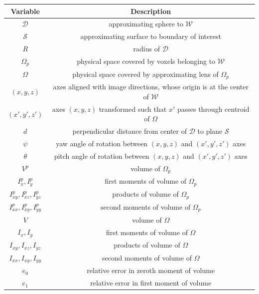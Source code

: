 \begin{table}[htbp!]
 \centering
   \begin{tabular}{|c||c|}
   \hline
   {\textbf{Variable}} & {\textbf{Description}} \\ \hline \hline
   $\mathcal{D}$ & approximating sphere to $\mathcal{W}$ \\ \hline
   $\mathcal{S}$ & approximating surface to boundary of interest \\ \hline      
   $R$ & radius of $\mathcal{D}$ \\ \hline   
   $\Omega_p$ & physical space covered by voxels belonging to $\mathcal{W}$ \\ \hline
   $\Omega$ & physical space covered by approximating lens of $\Omega_p$ \\ \hline      
   $(x,y,z)$ & axes aligned with image directions, whose origin is at the center of $\mathcal{W}$\\ \hline
   {$(x',y',z')$} & axes $(x,y,z)$ transformed such that $x'$ passes through centroid of $\Omega$ \\ \hline
   $d$ & perpendicular distance from center of $\mathcal{D}$ to plane $\mathcal{S}$  \\ \hline
   $\psi$ & yaw angle of rotation between $(x,y,z)$ and $(x',y',z')$ axes \\ \hline   
   $\theta$ & pitch angle of rotation between $(x,y,z)$ and $(x',y',z')$ axes \\ \hline
   $V^p$ & volume of $\Omega_p$ \\ \hline
   $I_{x}^p, I_y^p$ & first moments of volume of $\Omega_p$ \\ \hline     
   $I_{xy}^p, I_{xz}^p, I_{yz}^p$ & products of volume of $\Omega_p$ \\ \hline      
   $I_{xx}^p, I_{xy}^p, I_{yy}^p$ & second moments of volume of $\Omega_p$ \\ \hline
   $V$ & volume of $\Omega$ \\ \hline
   $I_{x}, I_y$ & first moments of volume of $\Omega$ \\ \hline
   $I_{xy}, I_{xz}, I_{yz}$ & products of volume of $\Omega$ \\ \hline   
   $I_{xx}, I_{xy}, I_{yy}$ & second moments of volume of $\Omega$ \\ \hline
   $e_0$ & relative error in zeroth moment of volume \\ \hline
   $e_1$ & relative error in first moment of volume \\ \hline

\end{tabular}
\end{table}
